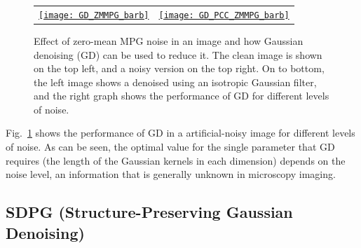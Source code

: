 \documentclass{article}
\begin{document}
\begin{figure}
{\begin{tabular}{cc}
      \href{https://nbviewer.org/github/vicente-gonzalez-ruiz/denoising/blob/main/figs/averaging_denoising.ipynb\#GD_0MMPG_barb}{\texttt{[image: GD\_ZMMPG\_barb]}} & \href{https://nbviewer.org/github/vicente-gonzalez-ruiz/denoising/blob/main/figs/averaging_denoising.ipynb\#GD_PCC_ZMMPG_barb}{\texttt{[image: GD\_PCC\_ZMMPG\_barb]}}
    \end{tabular}
  }
  \caption{Effect of zero-mean MPG noise in an image and how Gaussian
    denoising (GD) can be used to reduce it. The clean image
    is shown on the top left, and a noisy version on the top right. On
    to bottom, the left image shows a denoised using an isotropic
    Gaussian filter, and the right graph shows the performance of GD
    for different levels of noise.\label{fig:GD_0MMPG}}
\end{figure}

Fig.~\ref{fig:GD_0MMPG} shows the performance of GD in a
artificial-noisy image for different levels of noise. As can be seen,
the optimal value for the single parameter that GD requires (the
length of the Gaussian kernels in each dimension) depends on the noise
level, an information that is generally unknown in microscopy imaging.

\subsection{SDPG (Structure-Preserving Gaussian Denoising) \cite{gonzalez2023structure}}
\end{document}
